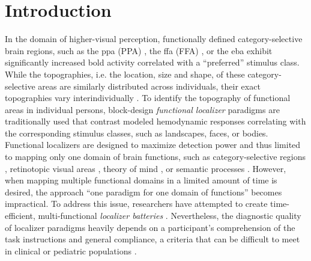



\section{Introduction}

In the domain of higher-visual perception, functionally defined
category-selective brain regions, such as the \acl{ppa} (PPA)
\citep{epstein1998ppa}, the \acl{ffa} (FFA) \citep{kanwisher1997ffa}, or the
\ac{eba} \citep{downing2001bodyarea} exhibit significantly increased \acf{bold}
activity correlated with a ``preferred'' \citep[][p.
123]{debeck2008interpreting} stimulus class.
%
While the topographies, i.e. the location, size and shape, of these
category-selective areas are similarly distributed across individuals, their
exact topographies vary interindividually \citep{rosenke2021probabilistic,
zhen2017quantifying, zhen2015quantifying, frost2012measuring}.
To identify the topography of functional areas in individual persons,
block-design \textit{functional localizer} paradigms are traditionally used that
contrast modeled hemodynamic responses correlating with the corresponding
stimulus classes, such as landscapes, faces, or bodies.
Functional localizers are designed to maximize detection power and thus limited
to mapping only one domain of brain functions, such as category-selective
regions \citep{stigliani2015temporal}, retinotopic visual areas
\citep{wang2015probabilistic}, theory of mind \citep{spunt2014validating}, or
semantic processes \citep{fedorenko2010new, fernandez2001language}.
However, when mapping multiple functional domains in a limited amount of time is
desired, the approach ``one paradigm for one domain of functions'' becomes
impractical.
To address this issue, researchers have attempted to create time-efficient,
multi-functional \textit{localizer batteries} \citep[e.g.,][]{barch2013function,
drobyshevsky2006rapid, pinel2007fast}.
Nevertheless, the diagnostic quality of localizer paradigms heavily depends on a
participant's comprehension of the task instructions and general compliance, a
criteria that can be difficult to meet in clinical or pediatric populations
\citep{eickhoff2020towards, vanderwal2019movies}.

